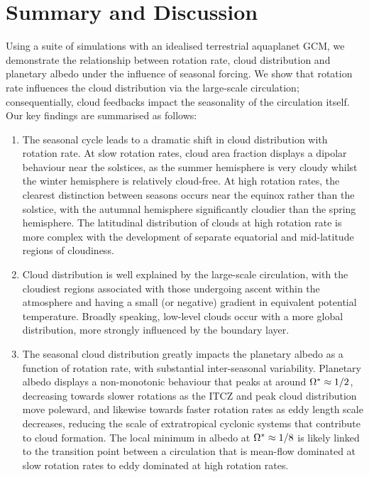 \section{Summary and Discussion}\label{sec:discussion}

Using a suite of simulations with an idealised terrestrial aquaplanet GCM, we demonstrate the relationship between rotation rate, cloud distribution and planetary albedo under the influence of seasonal forcing. We show that rotation rate influences the cloud distribution via the large-scale circulation; consequentially, cloud feedbacks impact the seasonality of the circulation itself. Our key findings are summarised as follows:
\begin{enumerate}
    \item The seasonal cycle leads to a dramatic shift in cloud distribution with rotation rate. At slow rotation rates, cloud area fraction displays a dipolar behaviour near the solstices, as the summer hemisphere is very cloudy whilst the winter hemisphere is relatively cloud-free. At high rotation rates, the clearest distinction between seasons occurs near the equinox rather than the solstice, with the autumnal hemisphere significantly cloudier than the spring hemisphere. The latitudinal distribution of clouds at high rotation rate is more complex with the development of separate equatorial and mid-latitude regions of cloudiness.
    
    \item Cloud distribution is well explained by the large-scale circulation, with the cloudiest regions associated with those undergoing ascent within the atmosphere and having a small (or negative) gradient in equivalent potential temperature. Broadly speaking, low-level clouds occur with a more global distribution, more strongly influenced by the boundary layer.
    
    \item The seasonal cloud distribution greatly impacts the planetary albedo as a function of rotation rate, with substantial inter-seasonal variability. Planetary albedo displays a non-monotonic behaviour that peaks at around $\Omega^*\approx 1/2$, decreasing towards slower rotations as the ITCZ and peak cloud distribution move poleward, and likewise towards faster rotation rates as eddy length scale decreases, reducing the scale of extratropical cyclonic systems that contribute to cloud formation. The local minimum in albedo at $\Omega^*\approx 1/8$ is likely linked to the transition point between a circulation that is mean-flow dominated at slow rotation rates to eddy dominated at high rotation rates.


\end{enumerate}

